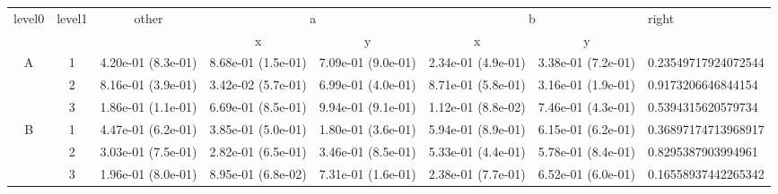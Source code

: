 \begin{tabular}{cccccccl}
\toprule
\multirow{2}{*}{level0} & \multirow{2}{*}{level1}& \multirow{2}{*}{other}&\multicolumn{2}{c}{a}&\multicolumn{2}{c}{b}& \multirow{2}{*}{right}\tabularnewline
\cmidrule(lr){4-5}
\cmidrule(lr){6-7}
&&&x&y&x&y\tabularnewline
\midrule
\multirow{3}{*}{A}&1& 4.20e-01 (8.3e-01)& 8.68e-01 (1.5e-01)& 7.09e-01 (9.0e-01)& 2.34e-01 (4.9e-01)& 3.38e-01 (7.2e-01)& 0.23549717924072544\tabularnewline
&2& 8.16e-01 (3.9e-01)& 3.42e-02 (5.7e-01)& 6.99e-01 (4.0e-01)& 8.71e-01 (5.8e-01)& 3.16e-01 (1.9e-01)& 0.9173206646844154\tabularnewline
&3& 1.86e-01 (1.1e-01)& 6.69e-01 (8.5e-01)& 9.94e-01 (9.1e-01)& 1.12e-01 (8.8e-02)& 7.46e-01 (4.3e-01)& 0.5394315620579734\tabularnewline
\midrule
\multirow{3}{*}{B}&1& 4.47e-01 (6.2e-01)& 3.85e-01 (5.0e-01)& 1.80e-01 (3.6e-01)& 5.94e-01 (8.9e-01)& 6.15e-01 (6.2e-01)& 0.36897174713968917\tabularnewline
&2& 3.03e-01 (7.5e-01)& 2.82e-01 (6.5e-01)& 3.46e-01 (8.5e-01)& 5.33e-01 (4.4e-01)& 5.78e-01 (8.4e-01)& 0.8295387903994961\tabularnewline
&3& 1.96e-01 (8.0e-01)& 8.95e-01 (6.8e-02)& 7.31e-01 (1.6e-01)& 2.38e-01 (7.7e-01)& 6.52e-01 (6.0e-01)& 0.16558937442265342\tabularnewline
\bottomrule
\end{tabular}
